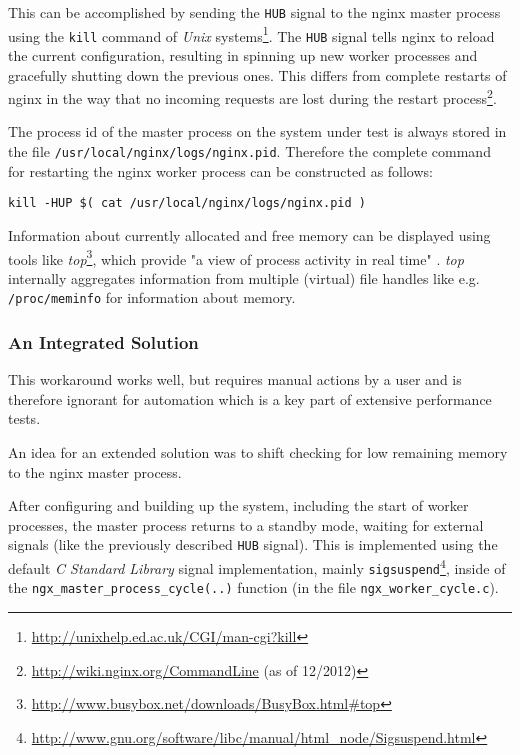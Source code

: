 This can be accomplished by sending the \texttt{HUB} signal to the nginx master process using the \texttt{kill} command of \textit{Unix} systems\footnote{\url{http://unixhelp.ed.ac.uk/CGI/man-cgi?kill}}. The \texttt{HUB} signal tells nginx to reload the current configuration, resulting in spinning up new worker processes and gracefully shutting down the previous ones. This differs from complete restarts of nginx in the way that no incoming requests are lost during the restart process\footnote{\url{http://wiki.nginx.org/CommandLine} (as of 12/2012)}.

The process id of the master process on the system under test is always stored in the file \texttt{/usr/local/nginx/logs/nginx.pid}. Therefore the complete command for restarting the nginx worker process can be constructed as follows:

\begin{verbatim}
kill -HUP $( cat /usr/local/nginx/logs/nginx.pid )
\end{verbatim}

Information about currently allocated and free memory can be displayed using tools like \textit{top}\footnote{\url{http://www.busybox.net/downloads/BusyBox.html\#top}}, which provide "a view of process activity in real time" \cite{busybox}. \textit{top} internally aggregates information from multiple (virtual) file handles like e.g. \texttt{/proc/meminfo} for information about memory.

\subsubsection{An Integrated Solution}

This workaround works well, but requires manual actions by a user and is therefore ignorant for automation which is a key part of extensive performance tests.

An idea for an extended solution was to shift checking for low remaining memory to the nginx master process.

After configuring and building up the system, including the start of worker processes, the master process returns to a standby mode, waiting for external signals (like the previously described \texttt{HUB} signal). This is implemented using the default \textit{C Standard Library} signal implementation, mainly \texttt{sigsuspend}\footnote{\url{http://www.gnu.org/software/libc/manual/html\_node/Sigsuspend.html}}, inside of the \texttt{ngx\_master\_process\_cycle(..)} function (in the file \texttt{ngx\_worker\_cycle.c}).

